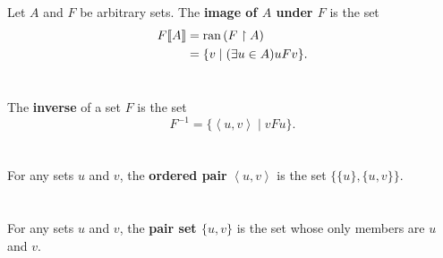 \documentclass{report}
\newcommand{\pair}[1]{\left< #1 \right>}
\begin{document}
Let $A$ and $F$ be arbitrary sets.
The \textbf{image of $A$ under $F$} is the set
  \begin{align*}
    F\!\left\llbracket A\right\rrbracket
      & = \mathop{\text{ran}}{(F \restriction A)} \\
      & = \{v \mid (\exists u \in A) uFv\}.
  \end{align*}

\begin{definition}


\end{definition}

\section{}%

The \textbf{inverse} of a set $F$ is the set
  $$F^{-1} = \{\pair{u, v} \mid vFu\}.$$

\begin{definition}


\end{definition}

\section{}%

For any sets $u$ and $v$, the \textbf{ordered pair} $\pair{u, v}$ is
  the set $\{\{u\}, \{u, v\}\}$.

\begin{definition}


\end{definition}

\section{}%

For any sets $u$ and $v$, the \textbf{pair set $\{u, v\}$} is the set whose
  only members are $u$ and $v$.

\begin{definition}

  \statementpadding



\end{definition}
\end{document}
